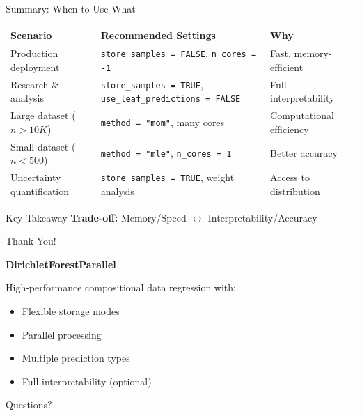 \documentclass[aspectratio=169]{beamer}
\begin{document}
\begin{frame}{Summary: When to Use What}

\begin{table}
\small
\begin{tabular}{lp{5cm}p{4cm}}
\toprule
\textbf{Scenario} & \textbf{Recommended Settings} & \textbf{Why} \\
\midrule
Production deployment & 
\texttt{store\_samples = FALSE}, \newline \texttt{n\_cores = -1} & 
Fast, memory-efficient \\
\midrule
Research \& analysis & 
\texttt{store\_samples = TRUE}, \newline \texttt{use\_leaf\_predictions = FALSE} & 
Full interpretability \\
\midrule
Large dataset ($n > 10K$) & 
\texttt{method = "mom"}, \newline many cores & 
Computational efficiency \\
\midrule
Small dataset ($n < 500$) & 
\texttt{method = "mle"}, \newline \texttt{n\_cores = 1} & 
Better accuracy \\
\midrule
Uncertainty quantification & 
\texttt{store\_samples = TRUE}, \newline weight analysis & 
Access to distribution \\
\bottomrule
\end{tabular}
\end{table}

\vspace{0.3cm}

\begin{alertblock}{Key Takeaway}
\textbf{Trade-off:} Memory/Speed $\leftrightarrow$ Interpretability/Accuracy
\end{alertblock}

\end{frame}

\begin{frame}{Thank You!}

\centering
\Large

\textbf{DirichletForestParallel}

\vspace{0.5cm}

\normalsize
High-performance compositional data regression with:
\begin{itemize}
\item Flexible storage modes
\item Parallel processing
\item Multiple prediction types
\item Full interpretability (optional)
\end{itemize}

\vspace{1cm}

Questions?

\end{frame}
\end{document}
